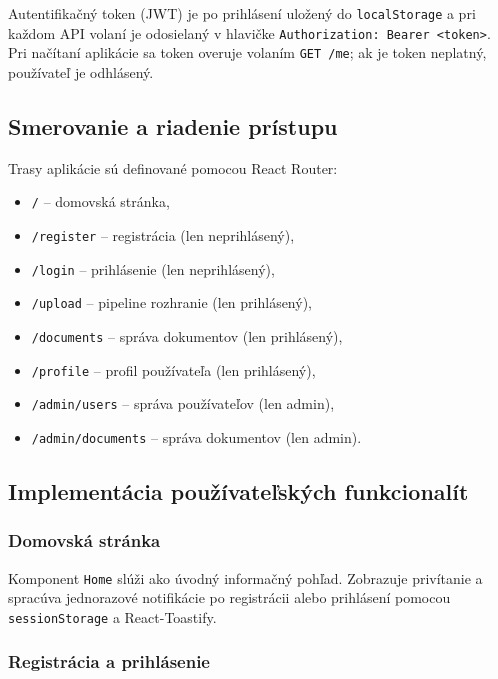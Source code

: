 Autentifikačný token (JWT) je po prihlásení uložený do \texttt{localStorage} a pri každom API volaní je odosielaný v hlavičke \texttt{Authorization: Bearer <token>}. Pri načítaní aplikácie sa token overuje volaním \texttt{GET /me}; ak je token neplatný, používateľ je odhlásený.

\subsection{Smerovanie a riadenie prístupu}

Trasy aplikácie sú definované pomocou React Router:

\begin{itemize}
    \item \texttt{/} – domovská stránka,
    \item \texttt{/register} – registrácia (len neprihlásený),
    \item \texttt{/login} – prihlásenie (len neprihlásený),
    \item \texttt{/upload} – pipeline rozhranie (len prihlásený),
    \item \texttt{/documents} – správa dokumentov (len prihlásený),
    \item \texttt{/profile} – profil používateľa (len prihlásený),
    \item \texttt{/admin/users} – správa používateľov (len admin),
    \item \texttt{/admin/documents} – správa dokumentov (len admin).
\end{itemize}

\subsection{Implementácia používateľských funkcionalít}

\subsubsection{Domovská stránka}

Komponent \texttt{Home} slúži ako úvodný informačný pohľad. Zobrazuje privítanie a spracúva jednorazové notifikácie po registrácii alebo prihlásení pomocou \texttt{sessionStorage} a React-Toastify.


\subsubsection{Registrácia a prihlásenie}


